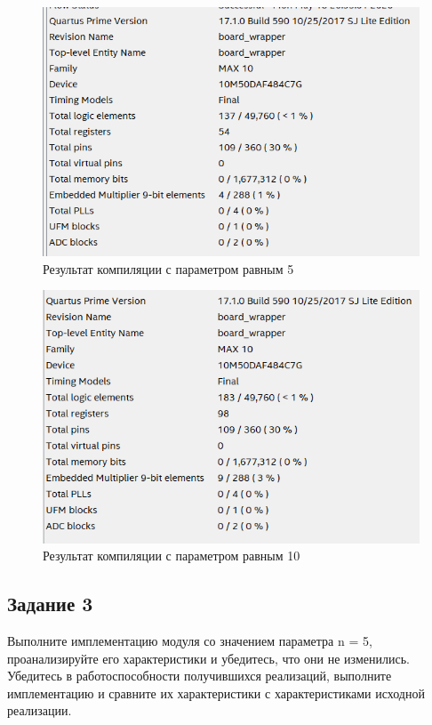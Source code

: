\documentclass[a4paper,14pt]{article}
\begin{document}
	\begin{figure}[H]
		\centering
		\includegraphics[width=0.8\linewidth]{images/z2_5}
		\caption{Результат компиляции с параметром равным 5}
		\label{fig:z25}
	\end{figure}
	
	\begin{figure}[H]
		\centering
		\includegraphics[width=0.8\linewidth]{images/z2_10}
		\caption{Результат компиляции с параметром равным 10}
		\label{fig:z210}
	\end{figure}
	
	
	\subsection{Задание 3}
	
	Выполните имплементацию модуля со значением параметра n = 5, проанализируйте его характеристики и убедитесь, что они не изменились. Убедитесь в работоспособности получившихся реализаций, выполните имплементацию и сравните их	характеристики с характеристиками исходной реализации.
	
\end{document}
